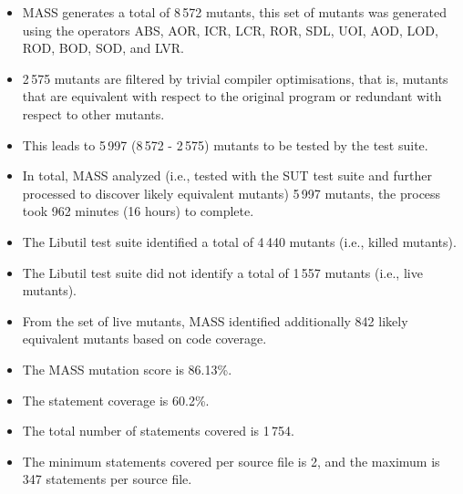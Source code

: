 \begin{itemize}
	\item MASS generates a total of 8\,572 mutants, this set of mutants was generated using the operators ABS, AOR, ICR, LCR, ROR, SDL, UOI, AOD, LOD, ROD, BOD, SOD, and LVR.

	\item 2\,575 mutants are filtered by trivial compiler optimisations, that is, mutants that are equivalent with respect to the original program or redundant with respect to other mutants.

    \item This leads to 5\,997 (8\,572 - 2\,575) mutants to be tested by the test suite.

	\item In total, MASS analyzed (i.e., tested with the SUT test suite and further processed to discover likely equivalent mutants) 5\,997 mutants, the process took 962 minutes (16 hours) to complete.

	\item The Libutil test suite identified a total of 4\,440 mutants (i.e., killed mutants).

	\item The Libutil test suite did not identify a total of 1\,557 mutants (i.e., live mutants).

	\item From the set of live mutants, MASS identified additionally 842 likely equivalent mutants based on code coverage.

	\item The MASS mutation score is 86.13\%.

	\item The statement coverage is 60.2\%.
	
	\item The total number of statements covered is 1\,754.
	
	\item The minimum statements covered per source file is 2, and the maximum is 347 statements per source file.
\end{itemize}


